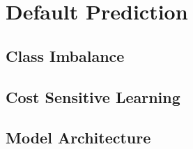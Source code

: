     \section{Default Prediction}
    
        \subsection{Class Imbalance}
        
        \subsection{Cost Sensitive Learning}
        
        \subsection{Model Architecture}
